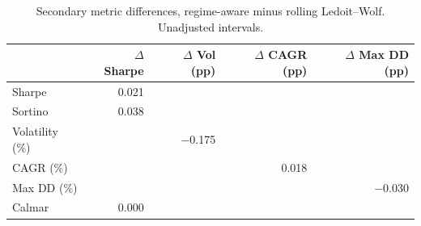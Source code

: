 \begin{table}[htbp]
\caption{Secondary metric differences, regime-aware minus rolling Ledoit--Wolf. Unadjusted intervals.}
\label{tab:table3_secondary_intervals}
\small
\begin{tabular}{lrrrr}
\toprule
 & $\Delta$ Sharpe & $\Delta$ Vol (pp) & $\Delta$ CAGR (pp) & $\Delta$ Max DD (pp) \\
\midrule
Sharpe & 0.021 &  &  &  \\
Sortino & 0.038 &  &  &  \\
Volatility (\%) &  & $-$0.175 &  &  \\
CAGR (\%) &  &  & 0.018 &  \\
Max DD (\%) &  &  &  & $-$0.030 \\
Calmar & 0.000 &  &  &  \\
\bottomrule
\end{tabular}
\end{table}
